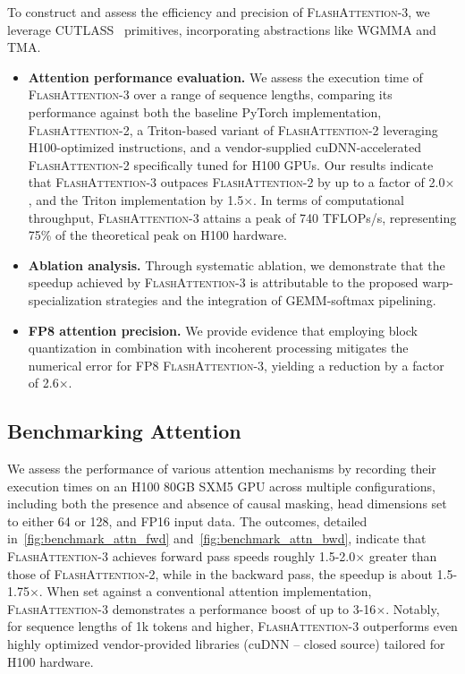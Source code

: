 To construct and assess the efficiency and precision of \textsc{FlashAttention-3}, we leverage CUTLASS~\citep{Thakkar_CUTLASS_2023} primitives, incorporating abstractions like WGMMA and TMA.

\begin{itemize}

\item \textbf{Attention performance evaluation.} We assess the execution time of \textsc{FlashAttention-3} over a range of sequence lengths, comparing its performance against both the baseline PyTorch implementation, \textsc{FlashAttention-2}, a Triton-based variant of \textsc{FlashAttention-2} leveraging H100-optimized instructions, and a vendor-supplied cuDNN-accelerated \textsc{FlashAttention-2} specifically tuned for H100 GPUs. Our results indicate that \textsc{FlashAttention-3} outpaces \textsc{FlashAttention-2} by up to a factor of 2.0$\times$, and the Triton implementation by 1.5$\times$. In terms of computational throughput, \textsc{FlashAttention-3} attains a peak of 740 TFLOPs/s, representing 75\% of the theoretical peak on H100 hardware.

\item \textbf{Ablation analysis.} Through systematic ablation, we demonstrate that the speedup achieved by \textsc{FlashAttention-3} is attributable to the proposed warp-specialization strategies and the integration of GEMM-softmax pipelining.

\item \textbf{FP8 attention precision.} We provide evidence that employing block quantization in combination with incoherent processing mitigates the numerical error for FP8 \textsc{FlashAttention-3}, yielding a reduction by a factor of 2.6$\times$.
\end{itemize}

\subsection{Benchmarking Attention}
\label{subsec:benchmark_attn}

We assess the performance of various attention mechanisms by recording their execution times on an H100 80GB SXM5 GPU across multiple configurations, including both the presence and absence of causal masking, head dimensions set to either 64 or 128, and FP16 input data. The outcomes, detailed in~\cref{fig:benchmark_attn_fwd} and~\cref{fig:benchmark_attn_bwd}, indicate that \textsc{FlashAttention-3} achieves forward pass speeds roughly 1.5-2.0$\times$ greater than those of \textsc{FlashAttention-2}, while in the backward pass, the speedup is about 1.5-1.75$\times$. When set against a conventional attention implementation, \textsc{FlashAttention-3} demonstrates a performance boost of up to 3-16$\times$. Notably, for sequence lengths of 1k tokens and higher, \textsc{FlashAttention-3} outperforms even highly optimized vendor-provided libraries (cuDNN -- closed source) tailored for H100 hardware.

